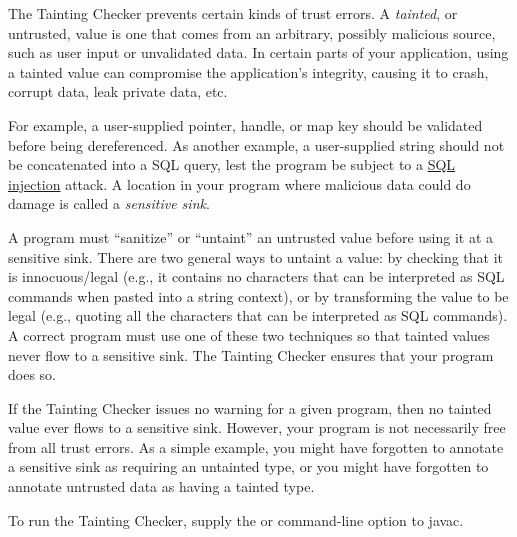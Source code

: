 
The Tainting Checker prevents certain kinds of trust errors.
A \emph{tainted}, or untrusted, value is one that comes from an arbitrary,
possibly malicious source, such as user input or unvalidated data.
In certain parts of your application, using a tainted value can compromise
the application's integrity, causing it to crash, corrupt data, leak
private data, etc.


For example, a user-supplied pointer, handle, or map key should be
validated before being dereferenced.
As another example, a user-supplied string should not be concatenated into a
SQL query, lest the program be subject to a
\href{https://en.wikipedia.org/wiki/Sql_injection}{SQL injection} attack.
A location in your program where malicious data could do damage is
called a \emph{sensitive sink}.

A program must ``sanitize'' or ``untaint'' an untrusted value before using
it at a sensitive sink.  There are two general ways to untaint a value:
by checking
that it is innocuous/legal (e.g., it contains no characters that can be
interpreted as SQL commands when pasted into a string context), or by
transforming the value to be legal (e.g., quoting all the characters that
can be interpreted as SQL commands).  A correct program must use one of
these two techniques so that tainted values never flow to a sensitive sink.
The Tainting Checker ensures that your program does so.

If the Tainting Checker issues no warning for a given program, then no
tainted value ever flows to a sensitive sink.  However, your program is not
necessarily free from all trust errors.  As a simple example, you might
have forgotten to annotate a sensitive sink as requiring an untainted type,
or you might have forgotten to annotate untrusted data as having a tainted
type.

To run the Tainting Checker, supply the
or
command-line option to javac.




